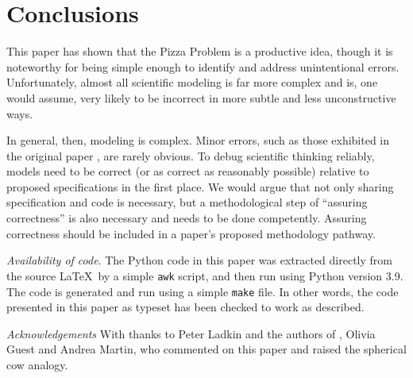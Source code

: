 \documentclass[11pt]{article}
\begin{document}
\section{Conclusions}
This paper has shown that the Pizza Problem is a productive idea, though it is noteworthy for being simple enough to identify and address unintentional errors. Unfortunately, almost all scientific modeling is far more complex and is, one would assume, very likely to be incorrect in more subtle and less unconstructive ways.

In general, then, modeling is complex. Minor errors, such as those exhibited in the original paper \cite{pizzap}, are rarely obvious. To debug scientific thinking reliably, models need to be correct (or as correct as reasonably possible) relative to proposed specifications in the first place. We would argue that not only sharing specification and code is necessary, but a methodological step of ``assuring correctness'' is also necessary and needs to be done competently. Assuring correctness should be included in a paper's proposed methodology pathway.

\emph{Availability of code}. The Python code in this paper was extracted directly from the source \LaTeX\ by a simple \texttt{awk} script, and then run using Python version 3.9. The code is generated and run using a simple \texttt{make} file. In other words, the code presented in this paper as typeset has been checked to work as described.

\emph{Acknowledgements}
With thanks to Peter Ladkin and the authors of \cite{pizzap}, Olivia Guest and Andrea Martin, who commented on this paper and raised the spherical cow analogy.
\end{document}
